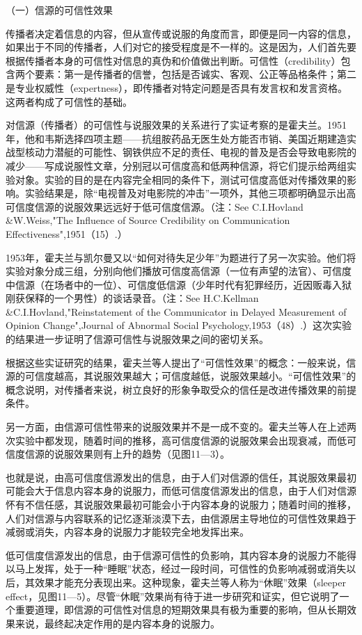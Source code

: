 \documentclass[UTF8,12pt]{ctexart}
\numberwithin{equation}{section} %
\numberwithin{figure}{section}
\numberwithin{table}{section}
\begin{document}
	（一）信源的可信性效果
	
	传播者决定着信息的内容，但从宣传或说服的角度而言，即便是同一内容的信息，如果出于不同的传播者，人们对它的接受程度是不一样的。这是因为，人们首先要根据传播者本身的可信性对信息的真伪和价值做出判断。可信性（credibility）包含两个要素：第一是传播者的信誉，包括是否诚实、客观、公正等品格条件；第二是专业权威性（expertness），即传播者对特定问题是否具有发言权和发言资格。这两者构成了可信性的基础。
	
	对信源（传播者）的可信性与说服效果的关系进行了实证考察的是霍夫兰。1951年，他和韦斯选择四项主题——抗组胺药品无医生处方能否市销、美国近期建造实战型核动力潜艇的可能性、钢铁供应不足的责任、电视的普及是否会导致电影院的减少——写成说服性文章，分别冠以可信度高和低两种信源，将它们提示给两组实验对象。实验的目的是在内容完全相同的条件下，测试可信度高低对传播效果的影响。实验结果是，除“电视普及对电影院的冲击”一项外，其他三项都明确显示出高可信度信源的说服效果远远好于低可信度信源。（注：See C.I.Hovland \&W.Weiss,"The Influence of Source Credibility on Communication Effectiveness",1951（15）.）
	
	1953年，霍夫兰与凯尔曼又以“如何对待失足少年”为题进行了另一次实验。他们将实验对象分成三组，分别向他们播放可信度高信源（一位有声望的法官）、可信度中信源（在场者中的一位）、可信度低信源（少年时代有犯罪经历，近因贩毒入狱刚获保释的一个男性）的谈话录音。（注：See H.C.Kellman \&C.I.Hovland,"Reinstatement of the Communicator in Delayed Measurement of Opinion Change",Journal of Abnormal Social Psychology,1953（48）.）这次实验的结果进一步证明了信源可信性与说服效果之间的密切关系。
	
	根据这些实证研究的结果，霍夫兰等人提出了“可信性效果”的概念：一般来说，信源的可信度越高，其说服效果越大；可信度越低，说服效果越小。“可信性效果”的概念说明，对传播者来说，树立良好的形象争取受众的信任是改进传播效果的前提条件。
	
	另一方面，由信源可信性带来的说服效果并不是一成不变的。霍夫兰等人在上述两次实验中都发现，随着时间的推移，高可信度信源的说服效果会出现衰减，而低可信度信源的说服效果则有上升的趋势（见图11—3）。
	
	也就是说，由高可信度信源发出的信息，由于人们对信源的信任，其说服效果最初可能会大于信息内容本身的说服力，而低可信度信源发出的信息，由于人们对信源怀有不信任感，其说服效果最初可能会小于内容本身的说服力；随着时间的推移，人们对信源与内容联系的记忆逐渐淡漠下去，由信源居主导地位的可信性效果趋于减弱或消失，内容本身的说服力才能较完全地发挥出来。
	
	低可信度信源发出的信息，由于信源可信性的负影响，其内容本身的说服力不能得以马上发挥，处于一种“睡眠”状态，经过一段时间，可信性的负影响减弱或消失以后，其效果才能充分表现出来。这种现象，霍夫兰等人称为“休眠”效果（sleeper effect，见图11—5）。尽管“休眠”效果尚有待于进一步研究和证实，但它说明了一个重要道理，即信源的可信性对信息的短期效果具有极为重要的影响，但从长期效果来说，最终起决定作用的是内容本身的说服力。
	
\end{document}
